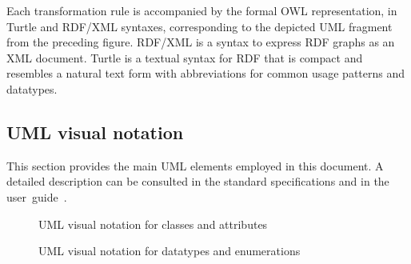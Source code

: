 	Each transformation rule is accompanied by the formal OWL representation, in Turtle \citep{turtle-Carothers:14:RT} and RDF/XML \citep{rdf-xml-Schreiber:14:RXS,rdf-xml-Beckett:04:RSS} syntaxes, corresponding to the depicted UML fragment from the preceding figure. RDF/XML is a syntax to express RDF graphs as an XML document. Turtle is a textual syntax for RDF \citep{rdf11} that is compact and resembles a natural text form with abbreviations for common usage patterns and datatypes.
	
	\subsection{UML visual notation}
	
	This section provides the main UML elements employed in this document. A detailed description can be consulted in the standard specifications \citep{uml2.5} and in the \mbox{user guide \cite{uml-userguide}}. 
	
	
	\begin{figure}[!ht]
		\centering
		\caption{UML visual notation for classes and attributes}
		\label{fig:uml-sheat-sheet-classes}
	\end{figure}
	
	\begin{figure}[!ht]
		\centering
		\caption{UML visual notation for datatypes and enumerations}
		\label{fig:uml-sheat-sheet-datatypes}
	\end{figure}
	
